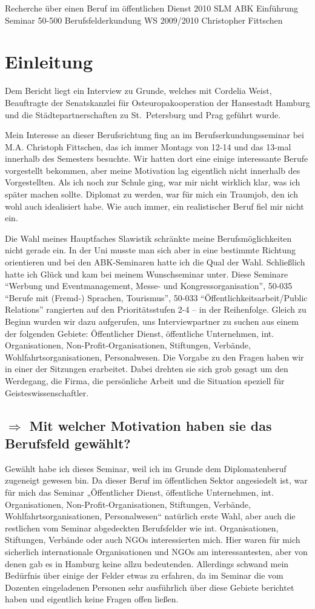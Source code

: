 \documentclass{../../sem_paper}
\newcommand\quest[1]{\subsection*{$\Rightarrow$ #1}}
\begin{document}
\titlepg
{Recherche über einen Beruf im öffentlichen Dienst}
{2010}
{SLM ABK Einführung}
{Seminar 50-500 Berufsfelderkundung}
{WS 2009/2010}
{Christopher Fittschen}

\tableofcontents
\thispagestyle{empty}

\section{Einleitung}
Dem Bericht liegt ein Interview zu Grunde, welches mit Cordelia Weist, Beauftragte der Senatskanzlei für Osteuropakooperation der Hansestadt Hamburg und die Städtepartnerschaften zu St.\ Petersburg und Prag geführt wurde.

Mein Interesse an dieser Berufsrichtung fing an im Berufserkundungsseminar bei M.A. Christoph Fittschen, das ich immer Montags von 12-14 und das 13-mal innerhalb des Semesters besuchte. Wir hatten dort eine einige interessante Berufe vorgestellt bekommen, aber meine Motivation lag eigentlich nicht innerhalb des Vorgestellten.
Als ich noch zur Schule ging, war mir nicht wirklich klar, was ich später machen sollte. Diplomat zu werden, war für mich ein Traumjob, den ich wohl auch idealisiert habe. Wie auch immer, ein realistischer Beruf fiel mir nicht ein. 

Die Wahl meines Hauptfaches Slawistik schränkte meine Berufsmöglichkeiten nicht gerade ein. In der Uni musste man sich aber in eine bestimmte Richtung orientieren und bei den ABK-Seminaren hatte ich die Qual der Wahl. Schließlich hatte ich Glück und kam bei meinem Wunschseminar unter. Diese Seminare ``Werbung und Eventmanagement, Messe- und Kongressorganisation'', 50-035 ``Berufe mit (Fremd-) Sprachen, Tourismus'', 50-033 ``Öffentlichkeitsarbeit/Public Relations'' rangierten auf den Prioritätsstufen 2-4 -- in der Reihenfolge. 
Gleich zu Beginn wurden wir dazu aufgerufen, uns Interviewpartner zu suchen aus einem der folgenden Gebiete: Öffentlicher Dienst, öffentliche Unternehmen, int. Organisationen, Non-Profit-Organisationen, Stiftungen, Verbände, Wohlfahrtsorganisationen, Personalwesen. 
Die Vorgabe zu den Fragen haben wir in einer der Sitzungen erarbeitet. Dabei drehten  sie sich grob gesagt um den Werdegang, die Firma, die persönliche Arbeit und die Situation speziell für Geisteswissenschaftler.

\quest{Mit welcher Motivation haben sie das Berufsfeld gewählt?}
Gewählt habe ich dieses Seminar, weil ich im Grunde dem  Diplomatenberuf zugeneigt gewesen bin. Da dieser Beruf im öffentlichen Sektor angesiedelt ist, war für mich das Seminar „Öffentlicher Dienst, öffentliche Unternehmen, int. Organisationen, 
Non-Profit-Organisationen, Stiftungen, Verbände, Wohlfahrtsorganisationen, Personalwesen“ natürlich erste Wahl, aber auch die restlichen vom Seminar abgedeckten Berufsfelder wie int. Organisationen, Stiftungen, Verbände oder auch NGOs interessierten mich. Hier waren für mich sicherlich internationale Organisationen und NGOs am interessantesten, aber von denen gab es in Hamburg keine allzu bedeutenden.
Allerdings schwand mein Bedürfnis über einige der Felder etwas zu erfahren, da im Seminar die vom Dozenten eingeladenen Personen sehr ausführlich über diese Gebiete berichtet haben und eigentlich keine Fragen offen ließen. 
\end{document}
